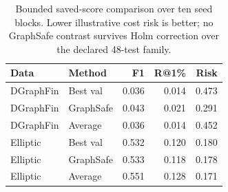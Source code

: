 \begin{table}[t]
\caption{Bounded saved-score comparison over ten seed blocks. Lower illustrative cost risk is better; no GraphSafe contrast survives Holm correction over the declared 48-test family.}
\label{tab:graphsafe}
\centering
\footnotesize
\setlength{\tabcolsep}{3.0pt}
\begin{tabular}{@{}llrrr@{}}
\toprule
Data & Method & F1 & R@1\% & Risk \\
\midrule
DGraphFin & Best val & 0.036 & 0.014 & 0.473 \\
DGraphFin & GraphSafe & 0.043 & 0.021 & 0.291 \\
DGraphFin & Average & 0.036 & 0.014 & 0.452 \\
Elliptic & Best val & 0.532 & 0.120 & 0.180 \\
Elliptic & GraphSafe & 0.533 & 0.118 & 0.178 \\
Elliptic & Average & 0.551 & 0.128 & 0.171 \\
\bottomrule
\end{tabular}
\end{table}
